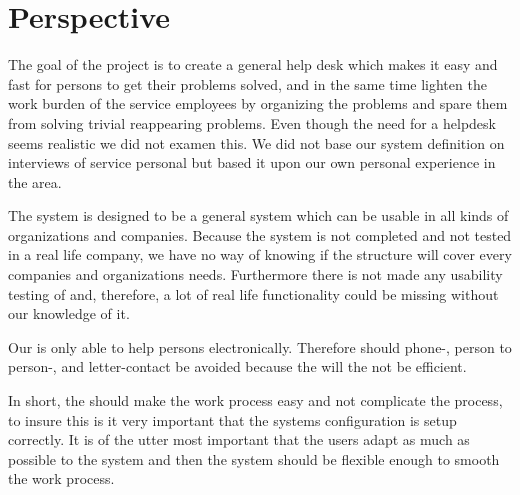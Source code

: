 \chapter{Perspective}
\label{chap:perspective}
The goal of the project is to create a general help desk which makes it easy and fast for persons to get their problems solved, and in the same time lighten the work burden of the service employees by organizing the problems and spare them from solving trivial reappearing problems. 
Even though the need for a helpdesk seems realistic we did not examen this. We did not base our system definition on interviews of service personal but based it upon our own personal experience in the area. 

The system is designed to be a general system which can be usable in all kinds of organizations and companies. 
Because the system is not completed and not tested in a real life company, we have no way of knowing if the structure will cover every companies and organizations needs. Furthermore there is not made any usability testing of \hdesk[] and, therefore, a lot of real life functionality could be missing without our knowledge of it.   

Our \hdesk[] is only able to help persons electronically. Therefore should phone-, person to person-, and letter-contact be avoided because the \hdesk will the not be efficient.    

In short, the \hdesk[] should make the work process easy and not complicate the process, to insure this is it very important that the systems configuration is setup correctly. It is of the utter most important that the users adapt as much as possible to the system and then the system should be flexible enough to smooth the work process.   


